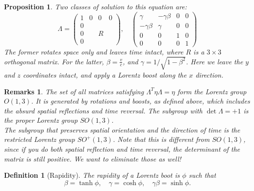 \documentclass[a4paper]{article}
\newtheorem{defi}{Definition}[section]
\newtheorem{remarks}{Remarks}[section]
\newtheorem{prop}{Proposition}[section]
\theoremstyle{new}
\begin{document}
\begin{prop}
Two classes of solution to this equation are:
$$\Lambda =
  \begin{pmatrix}
    1 & 0 & 0 & 0\\
    0\\
    0 & & R\\
    0
  \end{pmatrix},\quad \begin{pmatrix}
    \gamma & -\gamma \beta & 0 & 0\\
    -\gamma\beta & \gamma & 0 & 0\\
    0 & 0 & 1 & 0\\
    0 & 0 & 0 & 1
  \end{pmatrix}$$
The former rotates space only and leaves time intact, where $R$ is a $3\times 3$ orthogonal matrix. For the latter, $\beta = \frac{v}{c}$, and $\gamma = 1/\sqrt{1 - \beta^2}$. Here we leave the $y$ and $z$ coordinates intact, and apply a Lorentz boost along the $x$ direction.
\end{prop}
\begin{remarks}
The set of all matrices satisfying $\Lambda^T\eta\Lambda=\eta$ form the Lorentz group $O(1, 3)$. It is generated by rotations and boosts, as defined above, which includes the absurd spatial reflections and time reversal. The subgroup with $\det \Lambda = +1$ is the proper Lorentz group $SO(1, 3)$.\\[5pt]
The subgroup that preserves spatial orientation and the direction of time is the restricted Lorentz group $SO^+(1, 3)$. Note that this is different from $SO(1, 3)$, since if you do both spatial reflection and time reversal, the determinant of the matrix is still positive. We want to eliminate those as well!
\end{remarks}
\begin{defi}[Rapidity]
  The \emph{rapidity} of a Lorentz boot is $\phi$ such that
  \[
    \beta = \tanh \phi,\quad \gamma = \cosh\phi,\quad \gamma\beta=\sinh \phi.
  \]
\end{defi}
\end{document}
